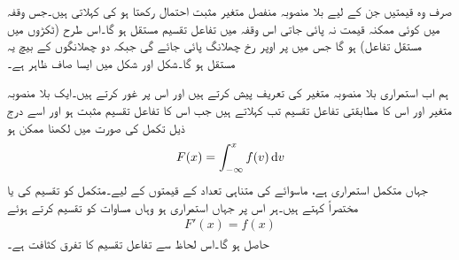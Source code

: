 صرف وہ  قیمتیں جن کے لیے بلا منصوبہ منفصل متغیر  مثبت احتمال رکھتا ہو  کی  کہلاتی ہیں۔جس وقفہ میں کوئی ممکنہ قیمت نہ پائی جاتی اس وقفہ میں تفاعل تقسیم  مستقل ہو گا۔اس طرح   (ٹکڑوں میں مستقل تفاعل) ہو گا جس میں  پر اوپر رخ  چھلانگ پائی جائے گی جبکہ دو چھلانگوں کے بیچ یہ مستقل ہو گا۔شکل  اور شکل  میں ایسا صاف ظاہر ہے۔

ہم اب استمراری بلا منصوبہ متغیر کی تعریف پیش کرتے ہیں اور اس پر غور کرتے ہیں۔ایک بلا منصوبہ متغیر  اور اس کا مطابقتی تفاعل تقسیم تب  کہلاتے ہیں جب اس کا تفاعل تقسیم  مثبت ہو اور اسے درج ذیل تکمل کی صورت میں لکھنا ممکن ہو
\begin{align}\label{مساوات_شماریات_استمراری_بلا_منصوبہ_متغیر_الف}
F(x)=\int_{-\infty}^{x} f(v)\dif v
\end{align}
جہاں متکمل استمراری ہے، ماسوائے   کی متناہی تعداد  کے قیمتوں کے لیے۔متکمل  کو تقسیم کی  یا مختصراً  کہتے ہیں۔ہر اس  پر جہاں  استمراری ہو وہاں مساوات  کو تقسیم کرتے ہوئے 
\begin{align*}
F'(x)=f(x)
\end{align*}
حاصل ہو گا۔اس لحاظ سے تفاعل تقسیم کا تفرق کثافت ہے۔


